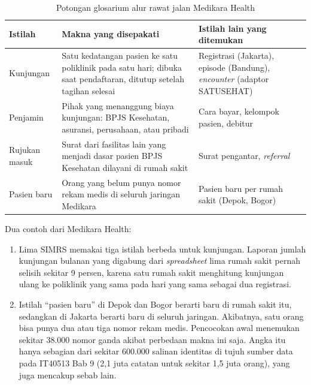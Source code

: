 \begin{table}[!htb]
  \centering
  \caption{Potongan glosarium alur rawat jalan Medikara Health}
  \label{tab:ch06-glosarium}
  \footnotesize
  \begin{tabularx}{\textwidth}{>{\raggedright\arraybackslash}p{2.0cm} >{\raggedright\arraybackslash}X >{\raggedright\arraybackslash}p{3.4cm}}
    \hline
    \textbf{Istilah} & \textbf{Makna yang disepakati} & \textbf{Istilah lain yang ditemukan} \\
      \hline
    Kunjungan & Satu kedatangan pasien ke satu poliklinik pada satu hari; dibuka saat pendaftaran,
      ditutup setelah tagihan selesai & Registrasi (Jakarta), episode (Bandung),
      \textit{encounter} (adaptor SATUSEHAT) \\ \hline
    Penjamin & Pihak yang menanggung biaya kunjungan: BPJS Kesehatan, asuransi, perusahaan, atau
      pribadi & Cara bayar, kelompok pasien, debitur \\ \hline
    Rujukan masuk & Surat dari fasilitas lain yang menjadi dasar pasien BPJS Kesehatan dilayani di
      rumah sakit & Surat pengantar, \textit{referral} \\ \hline
    Pasien baru & Orang yang belum punya nomor rekam medis di seluruh jaringan Medikara & Pasien
      baru per rumah sakit (Depok, Bogor) \\ \hline
  \end{tabularx}
\end{table}

Dua contoh dari Medikara Health:
\begin{enumerate}
  \item Lima SIMRS memakai tiga istilah berbeda untuk kunjungan. Laporan jumlah kunjungan bulanan
        yang digabung dari \textit{spreadsheet} lima rumah sakit pernah selisih sekitar 9 persen,
        karena satu rumah sakit menghitung kunjungan ulang ke poliklinik yang sama pada hari yang
        sama sebagai dua registrasi.
  \item Istilah ``pasien baru'' di Depok dan Bogor berarti baru di rumah sakit itu, sedangkan di
        Jakarta berarti baru di seluruh jaringan. Akibatnya, satu orang bisa punya dua atau tiga
        nomor rekam medis. Pencocokan awal menemukan sekitar 38.000 nomor ganda akibat perbedaan
        makna ini saja. Angka itu hanya sebagian dari sekitar 600.000 salinan identitas di tujuh
        sumber data pada IT40513 Bab 9 (2,1 juta catatan untuk sekitar 1,5 juta orang), yang juga
        mencakup sebab lain.
\end{enumerate}

